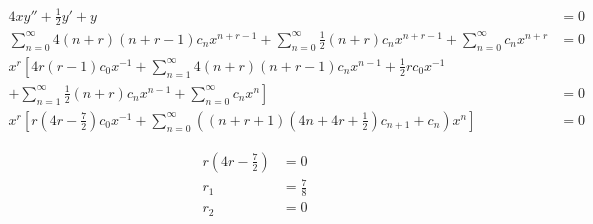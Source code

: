 \documentclass{article}
\begin{document}
\begin{align*}
  4 x y'' + \frac{1}{2} y' + y                                                                                                                                                 & = 0 \\
  \sum_{n = 0}^\infty 4 (n + r) (n + r - 1) c_n x^{n + r - 1} + \sum_{n = 0}^\infty \frac{1}{2} (n + r) c_n x^{n + r - 1} + \sum_{n = 0}^\infty c_n x^{n + r}                  & = 0 \\
  x^r \left[ 4 r (r - 1) c_0 x^{-1} + \sum_{n = 1}^\infty 4 (n + r) (n + r - 1) c_n x^{n - 1} + \frac{1}{2} r c_0 x^{-1} \right. \qquad                                        &     \\
  \left. + \sum_{n = 1}^\infty \frac{1}{2} (n + r) c_n x^{n - 1} + \sum_{n = 0}^\infty c_n x^n \right]                                                                         & = 0 \\
  x^r \left[ r \left( 4 r - \frac{7}{2} \right) c_0 x^{-1} + \sum_{n = 0}^\infty \left( (n + r + 1) \left( 4 n + 4 r + \frac{1}{2} \right) c_{n + 1} + c_n \right) x^n \right] & = 0
\end{align*}

\begin{align*}
  r \left( 4 r - \frac{7}{2} \right) & = 0           \\
  r_1                                & = \frac{7}{8} \\
  r_2                                & = 0
\end{align*}

\end{document}
